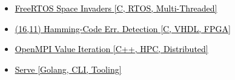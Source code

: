 \documentclass[10pt,a4paper,ragged2e,withhyper]{altacv}
\begin{document}
\begin{paracol}{2}

\begin{itemize}
\item \href{https://github.com/duclos-cavalcanti/FreeRTOS-SpaceInvaders}
     {\underline{{\textcolor{black}{FreeRTOS Space Invaders}}} \hfill  \textcolor{black}{[C, RTOS, Multi-Threaded]}}

 \item \href{https://github.com/duclos-cavalcanti/microsemi-error-detection}
     {\underline{{\textcolor{black}{(16,11) Hamming-Code Err. Detection}}} \hfill  \textcolor{black}{[C, VHDL, FPGA]}}

 \item \href{https://github.com/duclos-cavalcanti/Open-MPI-ValueIteration}
     {\underline{{\textcolor{black}{OpenMPI Value Iteration}}} \hfill  \textcolor{black}{[C++, HPC, Distributed]}}

 \item \href{https://github.com/duclos-cavalcanti/serve}
     {\underline{{\textcolor{black}{Serve}}} \hfill \textcolor{black}{[Golang, CLI, Tooling]}}
\end{itemize}




\end{paracol}
\end{document}
